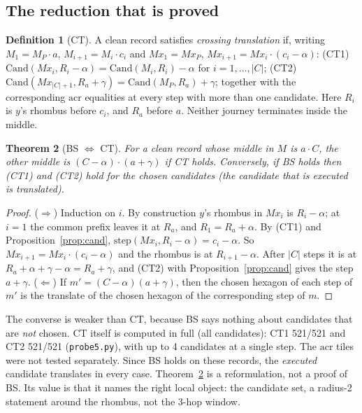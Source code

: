 \documentclass[11pt]{article}
\newtheorem{theorem}{Theorem}\newtheorem{lemma}[theorem]{Lemma}\newtheorem{proposition}[theorem]{Proposition}
\theoremstyle{definition}\newtheorem{definition}[theorem]{Definition}\newtheorem{remark}[theorem]{Remark}
\begin{document}
\subsection{The reduction that is proved}
\begin{definition}[CT]
A clean record satisfies \emph{crossing translation} if, writing $M_1=M_P\cdot a$, $M_{i+1}=M_i\cdot c_i$ and $Mx_1=Mx_P$, $Mx_{i+1}=Mx_i\cdot(c_i-\alpha)$:
(CT1) $\mathrm{Cand}(Mx_i,R_i-\alpha)=\mathrm{Cand}(M_i,R_i)-\alpha$ for $i=1,\dots,|C|$;
(CT2) $\mathrm{Cand}(Mx_{|C|+1},R_a+\gamma)=\mathrm{Cand}(M_P,R_a)+\gamma$;
together with the corresponding $\mathrm{acr}$ equalities at every step with more than one candidate. Here $R_i$ is $y$'s rhombus before $c_i$, and $R_a$ before $a$.
Neither journey terminates inside the middle.
\end{definition}
\begin{theorem}[BS $\Leftrightarrow$ CT]\label{thm:ct}
For a clean record whose middle in $M$ is $a\cdot C$, the other middle is $(C-\alpha)\cdot(a+\gamma)$ if CT holds.
Conversely, if BS holds then (CT1) and (CT2) hold for the \emph{chosen} candidates (the candidate that is executed is translated).
\end{theorem}
\begin{proof}
($\Rightarrow$) Induction on $i$. By construction $y$'s rhombus in $Mx_i$ is $R_i-\alpha$; at $i=1$ the common prefix leaves it at $R_a$, and $R_1=R_a+\alpha$.
By (CT1) and Proposition~\ref{prop:cand}, $\mathrm{step}(Mx_i,R_i-\alpha)=c_i-\alpha$. So $Mx_{i+1}=Mx_i\cdot(c_i-\alpha)$ and the rhombus is at $R_{i+1}-\alpha$.
After $|C|$ steps it is at $R_a+\alpha+\gamma-\alpha=R_a+\gamma$, and (CT2) with Proposition~\ref{prop:cand} gives the step $a+\gamma$.
($\Leftarrow$) If $m'=(C-\alpha)(a+\gamma)$, then the chosen hexagon of each step of $m'$ is the translate of the chosen hexagon of the corresponding step of $m$.
\end{proof}
\noindent The converse is weaker than CT, because BS says nothing about candidates that are \emph{not} chosen. CT itself is computed in full (all candidates): CT1 521/521 and CT2 521/521 (\texttt{probe5.py}),
with up to 4 candidates at a single step. The $\mathrm{acr}$ tiles were not tested separately. Since BS holds on these records, the \emph{executed} candidate translates in every case. Theorem~\ref{thm:ct} is a reformulation, not a proof of BS. Its value is that it names the right local object: the candidate set, a radius-2 statement around the rhombus, not the 3-hop window.
\end{document}
